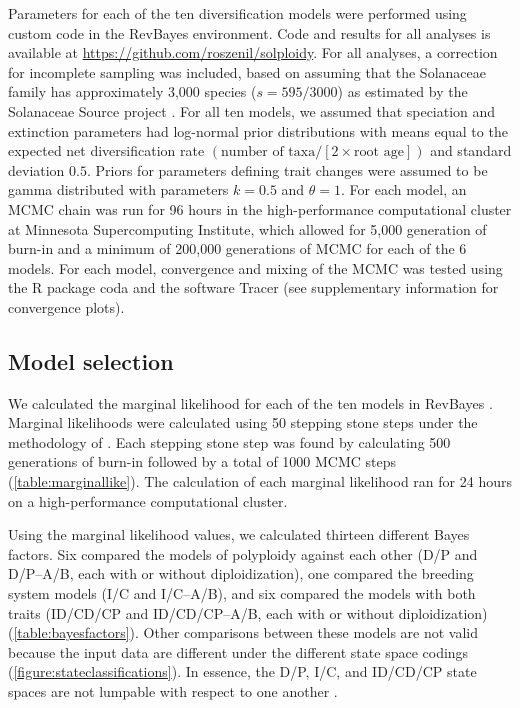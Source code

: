 Parameters for each of the ten diversification models were performed using custom code in the RevBayes \citep{hoehna_2016} environment.
Code and results for all analyses is available at \url{https://github.com/roszenil/solploidy}.
For all analyses, a correction for incomplete sampling was included, based on assuming that the Solanaceae family has approximately 3,000 species ($s=595/3000$) as estimated by the Solanaceae Source project \citep{solsource}.
For all ten models, we assumed that speciation and extinction parameters  had log-normal prior distributions with means equal to the expected net diversification rate $(\text{number of taxa} / [2 \times \text{root age}])$ and standard deviation $0.5$.
Priors for parameters defining trait changes were assumed to be gamma distributed with parameters $k=0.5$ and $\theta=1$. 
For each model, an MCMC chain was run for 96 hours in the high-performance computational cluster at Minnesota Supercomputing Institute, which allowed for 5,000 generation of burn-in and a minimum of 200,000 generations of MCMC for each of the 6 models. 
For each model, convergence and mixing of the MCMC was tested using the R package coda and the software Tracer (see supplementary information for convergence plots). %

\subsection{Model selection}

We calculated the marginal likelihood for each of the ten models in RevBayes \citep{hoehna_2016}.
Marginal likelihoods were calculated using 50 stepping stone steps under the methodology of \citet{xie_2010}.
Each stepping stone step was found by calculating 500 generations of burn-in followed by a total of 1000 MCMC steps (\cref{table:marginallike}).
The calculation of each marginal likelihood ran for 24 hours on a high-performance computational cluster.

Using the marginal likelihood values, we calculated thirteen different Bayes factors. %
Six compared the models of polyploidy against each other (D/P and D/P--A/B, each with or without diploidization), one compared the breeding system models (I/C and I/C--A/B), and six compared the models with both traits (ID/CD/CP and ID/CD/CP--A/B, each with or without diploidization) (\cref{table:bayesfactors}).
%
Other comparisons between these models are not valid because the input data are different under the different state space codings (\cref{figure:stateclassifications}).
In essence, the D/P, I/C, and ID/CD/CP state spaces are not lumpable with respect to one another \citep{tarasov_2019}.

